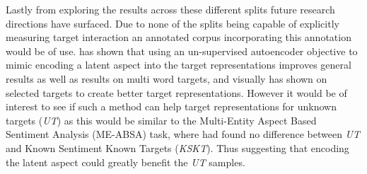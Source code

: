 Lastly from exploring the results across these different splits future research directions have surfaced. Due to none of the splits being capable of explicitly measuring target interaction an annotated corpus incorporating this annotation would be of use. \citet{he-etal-2018-effective} has shown that using an un-supervised autoencoder objective to mimic encoding a latent aspect into the target representations improves general results as well as results on multi word targets, and visually has shown on selected targets to create better target representations. However it would be of interest to see if such a method can help target representations for unknown targets (\textit{UT}) as this would be similar to the Multi-Entity Aspect Based Sentiment Analysis (ME-ABSA) task, where \citet{aug_yang2018multi} had found no difference between \textit{UT} and Known Sentiment Known Targets (\textit{KSKT}). Thus suggesting that encoding the latent aspect could greatly benefit the \textit{UT} samples.


